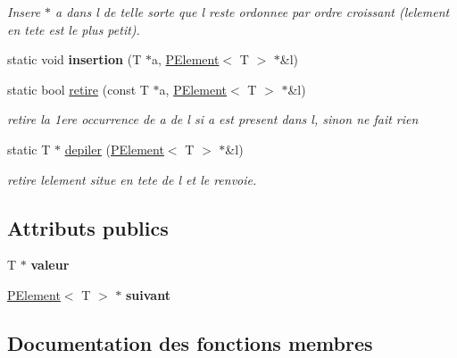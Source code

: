 \begin{DoxyCompactItemize}
\begin{DoxyCompactList}\small\item\em Insere $\ast$ a dans l de telle sorte que l reste ordonnee par ordre croissant (l\textquotesingle{}element en tete est le plus petit). \end{DoxyCompactList}\item 
\mbox{\label{class_p_element_a9ae596a40769fc8c75a673fe5388cbc9}} 
static void {\bfseries insertion} (T $\ast$a, \mbox{\hyperlink{class_p_element}{P\+Element}}$<$ T $>$ $\ast$\&l)
\item 
static bool \mbox{\hyperlink{class_p_element_aa9bb67abf314148c1ecdb83e16c9c16d}{retire}} (const T $\ast$a, \mbox{\hyperlink{class_p_element}{P\+Element}}$<$ T $>$ $\ast$\&l)
\begin{DoxyCompactList}\small\item\em retire la 1ere occurrence de a de l si a est present dans l, sinon ne fait rien \end{DoxyCompactList}\item 
static T $\ast$ \mbox{\hyperlink{class_p_element_a64309fcc01ade68603bf85c7dbb04c95}{depiler}} (\mbox{\hyperlink{class_p_element}{P\+Element}}$<$ T $>$ $\ast$\&l)
\begin{DoxyCompactList}\small\item\em retire l\textquotesingle{}element situe en tete de l et le renvoie. \end{DoxyCompactList}\end{DoxyCompactItemize}
\subsection*{Attributs publics}
\begin{DoxyCompactItemize}
\item 
\mbox{\label{class_p_element_a45e6966e33b9ae8029324ec1ec80db49}} 
T $\ast$ {\bfseries valeur}
\item 
\mbox{\label{class_p_element_a47fc5c13b7a974f98aa1e8656ee2c70b}} 
\mbox{\hyperlink{class_p_element}{P\+Element}}$<$ T $>$ $\ast$ {\bfseries suivant}
\end{DoxyCompactItemize}


\subsection{Documentation des fonctions membres}
\mbox{\label{class_p_element_aee7ccc9dcc49558af92960dd60fafc9d}} 

